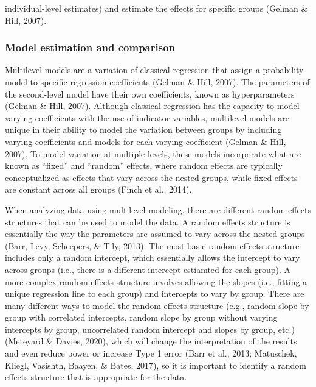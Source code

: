 \documentclass[
  english,
  man]{apa6}
\begin{document}
individual-level estimates) and estimate the effects for specific groups (Gelman \& Hill, 2007).

\hypertarget{model-estimation-and-comparison}{%
\subsubsection{Model estimation and comparison}\label{model-estimation-and-comparison}}

Multilevel models are a variation of classical regression that assign a probability model to specific regression coefficients (Gelman \& Hill, 2007). The parameters of the second-level model have their own coefficients, known as hyperparameters (Gelman \& Hill, 2007). Although classical regression has the capacity to model varying coefficients with the use of indicator variables, multilevel models are unique in their ability to model the variation between groups by including varying coefficients and models for each varying coefficient (Gelman \& Hill, 2007). To model variation at multiple levels, these models incorporate what are known as \enquote{fixed} and \enquote{random} effects, where random effects are typically conceptualized as effects that vary across the nested groups, while fixed effects are constant across all groups (Finch et al., 2014).

When analyzing data using multilevel modeling, there are different random effects structures that can be used to model the data. A random effects structure is essentially the way the parameters are assumed to vary across the nested groups (Barr, Levy, Scheepers, \& Tily, 2013). The most basic random effects structure includes only a random intercept, which essentially allows the intercept to vary across groups (i.e., there is a different intercept estiamted for each group). A more complex random effects structure involves allowing the slopes (i.e., fitting a unique regression line to each group) and intercepts to vary by group. There are many different ways to model the random effects structure (e.g., random slope by group with correlated intercepts, random slope by group without varying intercepts by group, uncorrelated random intercept and slopes by group, etc.) (Meteyard \& Davies, 2020), which will change the interpretation of the results and even reduce power or increase Type 1 error (Barr et al., 2013; Matuschek, Kliegl, Vasishth, Baayen, \& Bates, 2017), so it is important to identify a random effects structure that is appropriate for the data.
\end{document}

